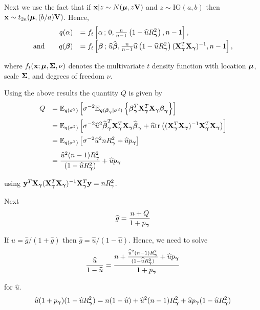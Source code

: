 \documentclass{article}[12pt]
\begin{document}
\noindent
Next we use the fact that if ${\bf x}|z \sim N({\boldsymbol \mu},z{\bf V})$ and $z\sim \mbox{IG}(a,b)$ then
${\bf x} \sim t_{2a}( {\boldsymbol \mu}, (b/a){\bf V})$. 
Hence,
$$
\begin{array}{rl} 
q(\alpha) 
& \displaystyle = f_t\left[ \alpha \,;\, 0, \tfrac{n}{n-1}  \left( 1 - \widehat{u} R_{\boldsymbol \gamma}^2\right), n - 1\right],
\\ [1ex]
\displaystyle \mbox{and} \qquad q({\boldsymbol \beta}) 
& \displaystyle = f_t\left[ {\boldsymbol \beta} \,;\,
\widehat{u} \widehat{{\boldsymbol \beta}},
\tfrac{n}{n-1}  \widehat{u} \left( 1 - \widehat{u} R_{\boldsymbol \gamma}^2\right) ({\bf X}_{\boldsymbol \gamma}^T{\bf X}_{\boldsymbol \gamma})^{-1}, n - 1
\right],
\end{array}
$$

\noindent where $f_t( {\bf x}; {\boldsymbol \mu}, {\boldsymbol \Sigma}, \nu)$ denotes the multivariate
$t$ density function with location ${\boldsymbol \mu}$, scale ${\boldsymbol \Sigma}$, and degrees of 
freedom $\nu$.

Using the above results the quantity $Q$ is given by
$$
\begin{array}{rl} 
\displaystyle Q
& \displaystyle = \displaystyle {\mathbb E}_{q(\sigma^2)}\left[ \sigma^{-2}
{\mathbb E}_{q({\boldsymbol \beta}_{\boldsymbol \gamma}|\sigma^2)}
\left\{ 
{\boldsymbol \beta}_{\boldsymbol \gamma}^T{\bf X}_{\boldsymbol \gamma}^T{\bf X}_{\boldsymbol \gamma}{\boldsymbol \beta}_{\boldsymbol \gamma}
\right\}
\right]
\\ [2ex]
& \displaystyle = \displaystyle {\mathbb E}_{q(\sigma^2)}\left[
\sigma^{-2} \widehat{u}^2 \widehat{{\boldsymbol \beta}}_{\boldsymbol \gamma}^T{\bf X}_{\boldsymbol \gamma}^T{\bf X}_{\boldsymbol \gamma}\widehat{{\boldsymbol \beta}}_{\boldsymbol \gamma}
+   \widehat{u}  \mbox{tr}\left(  ({\bf X}_{\boldsymbol \gamma}^T{\bf X}_{\boldsymbol \gamma})^{-1}  {\bf X}_{\boldsymbol \gamma}^T{\bf X}_{\boldsymbol \gamma} \right)
\right]
\\ [2ex]
& \displaystyle = \displaystyle {\mathbb E}_{q(\sigma^2)}\left[ 
\sigma^{-2}\widehat{u}^2 n R_{\boldsymbol \gamma}^2
+  \widehat{u} p_{\boldsymbol \gamma}
\right]
\\ [2ex]
& \displaystyle = \displaystyle 
\frac{\widehat{u}^2 (n-1) R_{\boldsymbol \gamma}^2}{( 1 - \widehat{u} R_{\boldsymbol \gamma}^2)}
+  \widehat{u} p_{\boldsymbol \gamma}
\end{array}
$$

\noindent using ${\bf y}^T{\bf X}_{\boldsymbol \gamma}({\bf X}_{\boldsymbol \gamma}^T{\bf X}_{\boldsymbol \gamma})^{-1}{\bf X}_{\boldsymbol \gamma}^T{\bf y}  = n R_\gamma^2$.

Next
$$
\widehat{g} = \frac{n + Q}{1 + p_{\boldsymbol \gamma}}
$$

\noindent If $\widehat{u} = \widehat{g}/(1+\widehat{g})$ then
$\widehat{g} =  \widehat{u}/(1 - \widehat{u})$. Hence, we need to solve
$$
\frac{\widehat{u}}{1 - \widehat{u}} = \frac{n + \frac{\widehat{u}^2 (n-1) R_{\boldsymbol \gamma}^2}{( 1 - \widehat{u} R_{\boldsymbol \gamma}^2)}
	+  \widehat{u} p_{\boldsymbol \gamma}}{1 + p_{\boldsymbol \gamma}}
$$

\noindent for $\widehat{u}$.  
$$
\widehat{u}(1 + p_{\boldsymbol \gamma})(1 - \widehat{u} R_{\boldsymbol \gamma}^2)
= n(1 - \widehat{u}) 
+ \widehat{u}^2 (n-1) R_{\boldsymbol \gamma}^2 
+  \widehat{u} p_{\boldsymbol \gamma} ( 1 - \widehat{u} R_{\boldsymbol \gamma}^2)
$$
\end{document}
